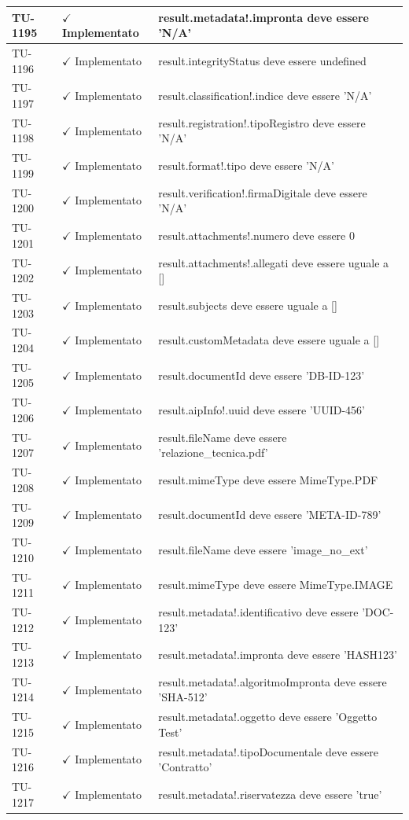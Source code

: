 ﻿\documentclass[a4paper,12pt]{article}
\newcommand{\ok}{\textcolor{green!60!black}{$\checkmark$ Implementato}}
\begin{document}
\begin{longtable}{|p{2cm}|p{3.5cm}|p{9.5cm}|}
\hline
TU-1195 & \ok & result.metadata!.impronta deve essere 'N/A' \\
\hline
TU-1196 & \ok & result.integrityStatus deve essere undefined \\
\hline
TU-1197 & \ok & result.classification!.indice deve essere 'N/A' \\
\hline
TU-1198 & \ok & result.registration!.tipoRegistro deve essere 'N/A' \\
\hline
TU-1199 & \ok & result.format!.tipo deve essere 'N/A' \\
\hline
TU-1200 & \ok & result.verification!.firmaDigitale deve essere 'N/A' \\
\hline
TU-1201 & \ok & result.attachments!.numero deve essere 0 \\
\hline
TU-1202 & \ok & result.attachments!.allegati deve essere uguale a [] \\
\hline
TU-1203 & \ok & result.subjects deve essere uguale a [] \\
\hline
TU-1204 & \ok & result.customMetadata deve essere uguale a [] \\
\hline
TU-1205 & \ok & result.documentId deve essere 'DB-ID-123' \\
\hline
TU-1206 & \ok & result.aipInfo!.uuid deve essere 'UUID-456' \\
\hline
TU-1207 & \ok & result.fileName deve essere 'relazione\_tecnica.pdf' \\
\hline
TU-1208 & \ok & result.mimeType deve essere MimeType.PDF \\
\hline
TU-1209 & \ok & result.documentId deve essere 'META-ID-789' \\
\hline
TU-1210 & \ok & result.fileName deve essere 'image\_no\_ext' \\
\hline
TU-1211 & \ok & result.mimeType deve essere MimeType.IMAGE \\
\hline
TU-1212 & \ok & result.metadata!.identificativo deve essere 'DOC-123' \\
\hline
TU-1213 & \ok & result.metadata!.impronta deve essere 'HASH123' \\
\hline
TU-1214 & \ok & result.metadata!.algoritmoImpronta deve essere 'SHA-512' \\
\hline
TU-1215 & \ok & result.metadata!.oggetto deve essere 'Oggetto Test' \\
\hline
TU-1216 & \ok & result.metadata!.tipoDocumentale deve essere 'Contratto' \\
\hline
TU-1217 & \ok & result.metadata!.riservatezza deve essere 'true' \\

\end{longtable}
\end{document}
